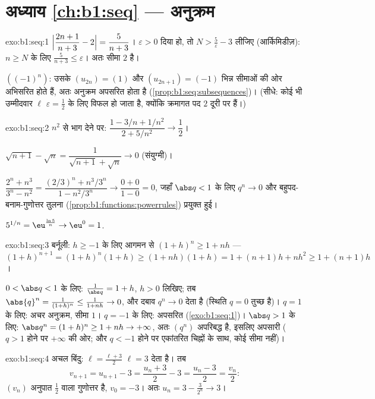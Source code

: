 \section*{अध्याय \ref{ch:b1:seq} --- अनुक्रम}

\begin{solution}{exo:b1:seq:1}
$\Bigl|\dfrac{2n+1}{n+3} - 2\Bigr| = \dfrac{5}{n+3}$। $\varepsilon > 0$ दिया
हो, तो $N > \frac 5\varepsilon - 3$ लीजिए (आर्किमिडीज़): $n \geq N$ के लिए
$\frac{5}{n+3} \leq \varepsilon$। अतः सीमा $2$ है।

$((-1)^n)$: उसके  $(u_{2n}) = (1)$ और $(u_{2n+1}) = (-1)$ भिन्न
सीमाओं की ओर अभिसरित होते हैं, अतः अनुक्रम अपसरित होता है
(\cref{prop:b1:seq:subsequences})। (सीधे: कोई भी उम्मीदवार $\ell$
$\varepsilon = \frac12$ के लिए विफल हो जाता है, क्योंकि क्रमागत पद $2$ दूरी
पर हैं।)
\end{solution}

\begin{solution}{exo:b1:seq:2}
$n^2$ से भाग देने पर: $\dfrac{1 - 3/n + 1/n^2}{2 + 5/n^2} \to \dfrac12$।

$\sqrt{n+1} - \sqrt n = \dfrac{1}{\sqrt{n+1} + \sqrt n} \to 0$ (संयुग्मी)।

$\dfrac{2^n + n^3}{3^n - n^2} = \dfrac{(2/3)^n + n^3/3^n}{1 - n^2/3^n} \to
\dfrac{0 + 0}{1 - 0} = 0$, जहाँ $\abs q < 1$ के लिए $q^n \to 0$ और
बहुपद-बनाम-गुणोत्तर तुलना (\cref{prop:b1:functions:powerrules}) प्रयुक्त
हुई।

$5^{1/n} = \eu^{\frac{\ln 5}{n}} \to \eu^0 = 1$.
\end{solution}

\begin{solution}{exo:b1:seq:3}
बर्नूली: $h \geq -1$ के लिए आगमन से $(1+h)^n \geq 1 + nh$ --- $(1+h)^{n+1} =
(1+h)^n(1+h) \geq (1+nh)(1+h) = 1 + (n+1)h + nh^2 \geq 1 + (n+1)h$।

$0 < \abs q < 1$ के लिए: $\frac{1}{\abs q} = 1 + h$, $h > 0$ लिखिए; तब
$\abs{q}^n = \frac{1}{(1+h)^n} \leq \frac{1}{1 + nh} \to 0$, और दबाव $q^n
\to 0$ देता है (स्थिति $q = 0$ तुच्छ है)। $q = 1$ के लिए: अचर अनुक्रम, सीमा
$1$। $q = -1$ के लिए: अपसरित (\cref{exo:b1:seq:1})। $\abs q > 1$ के लिए:
$\abs q^n = (1 + h)^n \geq 1 + nh \to +\infty$, अतः $(q^n)$ अपरिबद्ध है,
इसलिए अपसारी ($q > 1$ होने पर $+\infty$ की ओर; और $q < -1$ होने पर एकांतरित
चिह्नों के साथ, कोई सीमा नहीं)।
\end{solution}

\begin{solution}{exo:b1:seq:4}
अचल बिंदु: $\ell = \frac{\ell + 3}{2}$ $\ell = 3$ देता है। तब
\[
v_{n+1} = u_{n+1} - 3 = \frac{u_n + 3}{2} - 3 = \frac{u_n - 3}{2} =
\frac{v_n}{2}:
\]
$(v_n)$ अनुपात $\frac12$ वाला गुणोत्तर है, $v_0 = -3$। अतः $u_n = 3 -
\frac{3}{2^n} \to 3$।
\end{solution}

